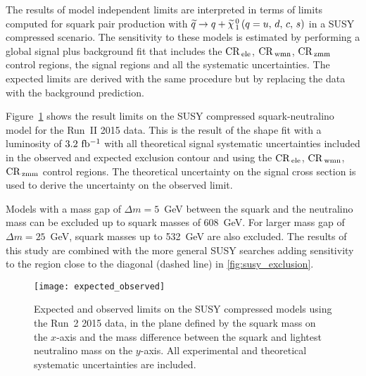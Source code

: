 The results of model independent limits are interpreted in terms of limits
computed for squark pair production with $\widetilde{q} \rightarrow q + \widetilde{\chi}_{\, 1}^{\, 0}\, (q = u,\, d,\, c,\, s)$ in a SUSY compressed
scenario. The sensitivity to these models is estimated by performing a global
signal plus background fit that includes the $\mathrm{CR}_\mathrm{\, ele}$, $\mathrm{CR}_\mathrm{\, wmn}$, $\mathrm{CR}_\mathrm{\, zmm}$
control regions, the signal regions and all the systematic uncertainties. The
expected limits are derived with the same procedure but by replacing the data
with the background prediction.

Figure~\ref{fig:expected_observed} shows the result limits on the SUSY
compressed squark-neutralino model for the Run~II 2015 data. This is the result
of the shape fit with a luminosity of $3.2~\mbox{fb$^{-1}$}$ with all theoretical signal
systematic uncertainties included in the observed and expected exclusion contour
and using the $\mathrm{CR}_\mathrm{\, ele}$, $\mathrm{CR}_\mathrm{\, wmn}$, $\mathrm{CR}_\mathrm{\, zmm}$ control regions. The theoretical
uncertainty on the signal cross section is used to derive the uncertainty on the
observed limit.

Models with a mass gap of $\Delta m = 5$~GeV between the squark and the
neutralino mass can be excluded up to squark masses of 608~GeV. For larger mass
gap of $\Delta m = 25$~GeV, squark masses up to 532~GeV are also excluded. The
results of this study are combined with the more general SUSY searches adding
sensitivity to the region close to the diagonal (dashed line) in
\cref{fig:susy_exclusion}.


\begin{figure}[!h]
  \centering
    \texttt{[image: expected\_observed]}
    \caption{Expected and observed limits on the SUSY compressed models using
      the Run~2 2015 data, in the plane defined by the squark mass on the
      $x$-axis and the mass difference between the squark and lightest
      neutralino mass on the $y$-axis. All experimental and theoretical
      systematic uncertainties are included.}
    \label{fig:expected_observed}
\end{figure}
